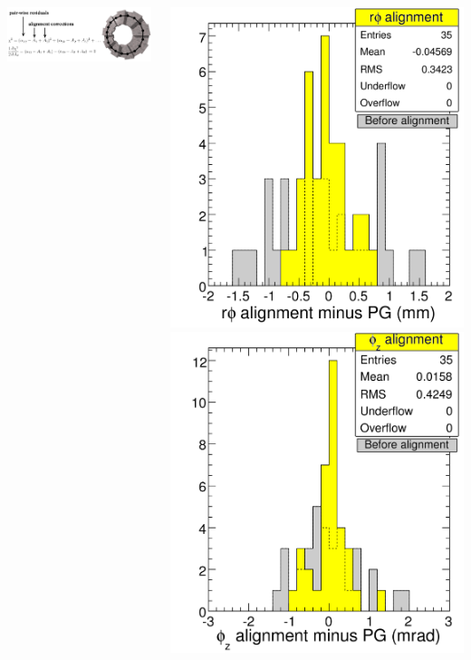 \documentclass[compress]{beamer}
\begin{document}
\begin{frame}
\begin{columns}
\vspace{0.5 cm}
\includegraphics[width=\linewidth]{matrix_description_onestation.png}

\vspace{0.5 cm}
\includegraphics[width=0.5\linewidth]{data_rphi.png}
\includegraphics[width=0.5\linewidth]{data_phiz.png}
\end{columns}
\end{frame}
\end{document}
